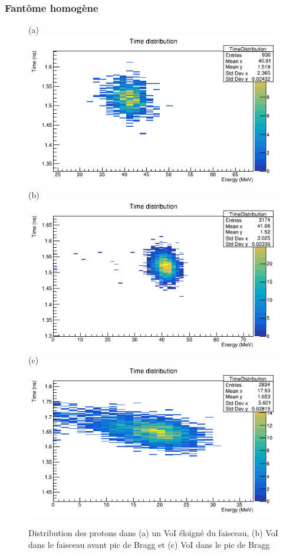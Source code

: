 \documentclass[11pt,a4paper,oldfontcommands]{memoir}
\begin{document}
\subsubsection{Fantôme homogène}
\begin{figure}[h!]
\centering
\subfloat(a){\includegraphics[scale=0.3]{homo/away.png}}
\subfloat(b){\includegraphics[scale=0.3]{homo/prebragg.png}}\\
\subfloat(c){\includegraphics[scale=0.3]{homo/Bragg.png}}
\label{homo prot}
\caption{ Distribution des protons dans (a) un VoI éloigné du faisceau, (b) VoI dans le faisceau avant pic de Bragg et (c) VoI dans le pic de Bragg }

\end{figure}
\end{document}

